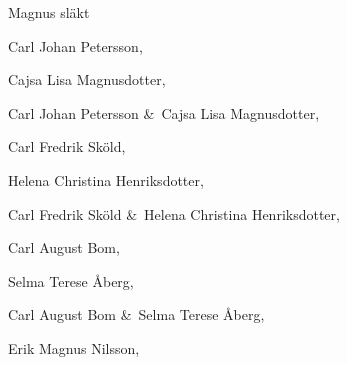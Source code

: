 
\vfill\break
\ifodd\pageno
	\else \null\footlinefalse\vfill\break
\fi

\centerline{Magnus släkt}

Carl Johan Petersson, \pgref[CJP]\par
Cajsa Lisa Magnusdotter, \pgref[CLM]\par
Carl Johan Petersson \&\ Cajsa Lisa Magnusdotter, \par
Carl Fredrik Sköld, \pgref[CFS]\par
Helena Christina Henriksdotter, \pgref[HCH]\par
Carl Fredrik Sköld \&\ Helena Christina Henriksdotter, \par
Carl August Bom, \pgref[CAB]\par
Selma Terese Åberg, \pgref[STÅ]\par
Carl August Bom \&\ Selma Terese Åberg, \par
Erik Magnus Nilsson, \pgref[EMN]\par
